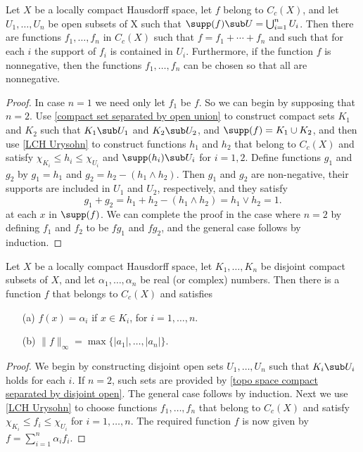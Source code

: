 \begin{proposition}\label{LCH decompose function with supp in open set}
Let $X$ be a locally compact Hausdorff space, let $f$ belong to $C_c(X)$, and let $U_1,\dots,U_n$ be open subsets of X such that $\supp(f)\sub U=\bigcup_{i=1}^{n}U_i$. Then there are functions $f_1,\dots,f_n$ in $C_c(X)$ such that $f=f_1+\cdots+f_n$ and such that for each $i$ the support of $f_i$ is contained in $U_i$. Furthermore, if the function $f$ is nonnegative, then the functions $f_1,\dots,f_n$ can be chosen so that all are nonnegative.
\end{proposition}
\begin{proof}
In case $n=1$ we need only let $f_1$ be $f$. So we can begin by supposing that $n=2$. Use \cref{compact set separated by open union} to construct compact sets $K_1$ and $K_2$ such that $K_1\sub U_1$ and $K_2\sub U_2$, and $\supp(f)=K_1\cup K_2$, and then use \cref{LCH Urysohn} to construct functions $h_1$ and $h_2$ that belong to $C_c(X)$ and satisfy $\chi_{K_i}\leq h_i\leq\chi_{U_i}$ and $\supp(h_i)\sub U_i$ for $i=1,2$. Define functions $g_1$ and $g_2$ by $g_1=h_1$ and $g_2=h_2-(h_1\wedge h_2)$. Then $g_1$ and $g_2$ are non-negative, their supports are included in $U_1$ and $U_2$, respectively, and they satisfy
\[g_1+g_2=h_1+h_2-(h_1\wedge h_2)=h_1\vee h_2=1.\]
at each $x$ in $\supp(f)$. We can complete the proof in the case where $n=2$ by defining $f_1$ and $f_2$ to be $fg_1$ and $fg_2$, and the general case follows by induction.
\end{proof}
\begin{proposition}\label{LCH function fixed finite value}
Let $X$ be a locally compact Hausdorff space, let $K_1,\dots,K_n$ be disjoint compact subsets of $X$, and let $\alpha_1,\dots,\alpha_n$ be real (or complex) numbers. Then there is a function $f$ that belongs to $C_c(X)$ and satisfies
\begin{itemize}
\item[(a)] $f(x)=\alpha_i$ if $x\in K_i$, for $i=1,\dots,n$.
\item[(b)] $\|f\|_{\infty}=\max\{|a_1|,\dots,|a_n|\}$.
\end{itemize}
\end{proposition}
\begin{proof}
We begin by constructing disjoint open sets $U_1,\dots,U_n$ such that $K_i\sub U_i$ holds for each $i$. If $n=2$, such sets are provided by \cref{topo space compact separated by disjoint open}. The general case follows by induction. Next we use \cref{LCH Urysohn} to choose functions $f_1,\dots,f_n$ that belong to $C_c(X)$ and satisfy $\chi_{K_i}\leq f_i\leq\chi_{U_i}$ for $i=1,\dots,n$. The required function $f$ is now given by $f=\sum_{i=1}^{n}\alpha_if_i$.
\end{proof}
